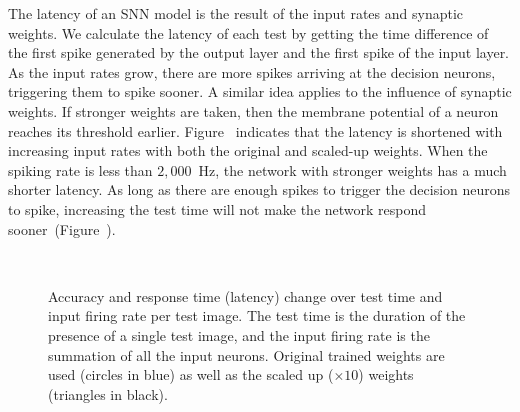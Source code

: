 \documentclass{frontiersENG} %
\begin{document}
The latency of an SNN model is the result of the input rates and synaptic weights.
We calculate the latency of each test by getting the time difference of the first spike generated by the output layer and the first spike of the input layer.
As the input rates grow, there are more spikes arriving at the decision neurons, triggering them to spike sooner.
A similar idea applies to the influence of synaptic weights.
If stronger weights are taken, then the membrane potential of a neuron reaches its threshold earlier.
Figure~ indicates that the latency is shortened with increasing input rates with both the original and scaled-up weights.
When the spiking rate is less than $2,000$~Hz, the network with stronger weights has a much shorter latency.
As long as there are enough spikes to trigger the decision neurons to spike, increasing the test time will not make the network respond sooner~(Figure~).
\begin{figure}[htb!]
	\centering
	\\
	\caption{Accuracy and response time (latency) change over test time and input firing rate per test image.
	The test time is the duration of the presence of a single test image, and the input firing rate is the summation of all the input neurons.
	Original trained weights are used (circles in blue) as well as the scaled up ($\times10$) weights (triangles in black). }
	\label{fig:assess}
\end{figure}
\end{document}
